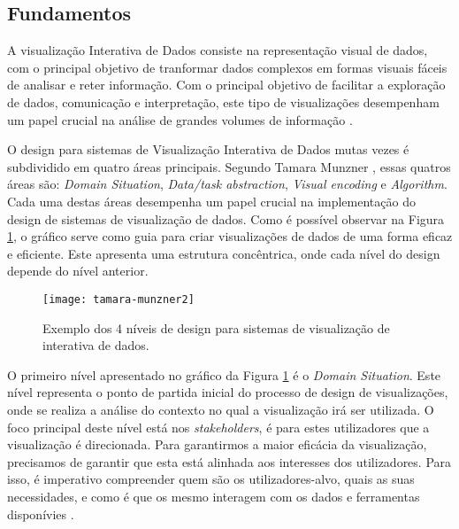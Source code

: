 \subsection{Fundamentos} %
\label{sub:fundamentos}
A visualização Interativa de Dados consiste na representação visual de dados, com o principal objetivo de tranformar dados complexos em formas visuais fáceis de analisar e reter informação. Com o principal objetivo de facilitar a exploração de dados, comunicação e interpretação, este tipo de visualizações desempenham um papel crucial na análise de grandes volumes de informação \cite{keim2002information}.
                                                                                                                        
O design para sistemas de Visualização Interativa de Dados mutas vezes é subdividido em quatro áreas principais. Segundo Tamara Munzner \cite{munzner2014visualization}, essas quatros áreas são: \textit{Domain Situation}, \textit{Data/task abstraction}, \textit{Visual encoding} e \textit{Algorithm}. Cada uma destas áreas desempenha um papel crucial na implementação do design de sistemas de visualização de dados. Como é possível observar na Figura \ref{fig:tamara-munzner-principles}, o gráfico serve como guia para criar visualizações de dados de uma forma eficaz e eficiente. Este apresenta uma estrutura concêntrica, onde cada nível do design depende do nível anterior.

\begin{figure}[htbp]
  \centering
  \texttt{[image: tamara-munzner2]}
  \caption{Exemplo dos 4 níveis de design para sistemas de visualização de interativa de dados.}
  \label{fig:tamara-munzner-principles}
\end{figure}

O primeiro nível apresentado no gráfico da Figura \ref{fig:tamara-munzner-principles} é o \textit{Domain Situation}. Este nível representa o ponto de partida inicial do processo de design de visualizações, onde se realiza a análise do contexto no qual a visualização irá ser utilizada. O foco principal deste nível está nos \textit{stakeholders}, é para estes utilizadores que a visualização é direcionada.
Para garantirmos a maior eficácia da visualização, precisamos de garantir que esta está alinhada aos interesses dos utilizadores. Para isso, é imperativo compreender quem são os utilizadores-alvo, quais as suas necessidades, e como é que os mesmo interagem com os dados e ferramentas disponívies \cite{courage2005understanding}.

